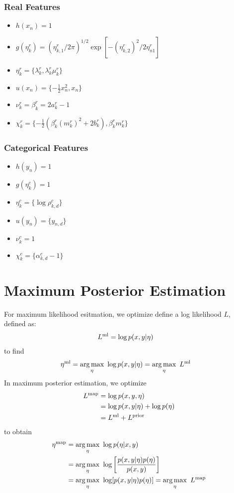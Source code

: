 \documentclass[a4paper,fleqn,10pt,openright,oldfontcommands]{memoir}
\begin{document}
\subsubsection{Real Features}
\begin{itemize}
	\item $h(x_n) = 1$
	\item $g(\eta_k^r) = (\eta_{k,1}^r / 2 \pi)^{1/2} \exp[- (\eta_{k,2}^r)^2 / 2 \eta_{n1}^r ]$
	\item $\eta_k^r = \{ \lambda_k^r, \lambda_k^r \mu_k^r \}$
	\item $u(x_n) = \{ -\tfrac{1}{2} x_n^2, x_n \}$
    \item $\nu_k^r = \beta^r_k = 2 a^r_k - 1$
    \item $\chi_k^r = \{ -\tfrac{1}{2}(\beta^r_k (m^r_k)^2 + 2 b^r_k), \beta^r_k m^r_k \} $
\end{itemize}

\subsubsection{Categorical Features}
\begin{itemize}
	\item $h(y_n) = 1$
	\item $g(\eta_k^c) = 1$     
	\item $\eta_k^c = \{ \log \rho_{k,d}^c \}$
	\item $u(y_n) = \{ y_{n,d} \}$
    \item $\nu_k^c = 1$
    \item $\chi_k^c = \{ \alpha^c_{k,d} - 1 \} $
\end{itemize}

\section*{Maximum Posterior Estimation}

For maximum likelihood esitmation, we optimize define a log likelihood $L$, defined as:
\begin{align*}
	L^{\rm ml}  &= \log p(x, y | \eta)    
\end{align*}
to find
\begin{align*}
    \eta^{\rm ml} &= \operatorname*{arg\,max}_\eta~ \log p(x, y | \eta)
           = \operatorname*{arg\,max}_\eta~ L^{\rm ml}
\end{align*}
In maximum posterior estimation, we optimize
\begin{align*}
    L^{\rm map}  &= \log p(x, y, \eta) \\
                 &= \log p(x, y | \eta) + \log p(\eta)  \\
                 &= L^{\rm ml} + L^{\rm prior}
\end{align*}   
to obtain
\begin{align*}
  \eta^{\rm map} 
    &= \operatorname*{arg\,max}_\eta~ 
       \log p(\eta | x, y) \\
    &= \operatorname*{arg\,max}_\eta~ 
       \log \left[ \frac{p(x, y | \eta) p(\eta)}{p(x,y)} \right] \\
    &= \operatorname*{arg\,max}_\eta~ \log[p(x, y | \eta) p(\eta)] 
     = \operatorname*{arg\,max}_\eta~ L^{\rm map}
\end{align*}
\end{document}
